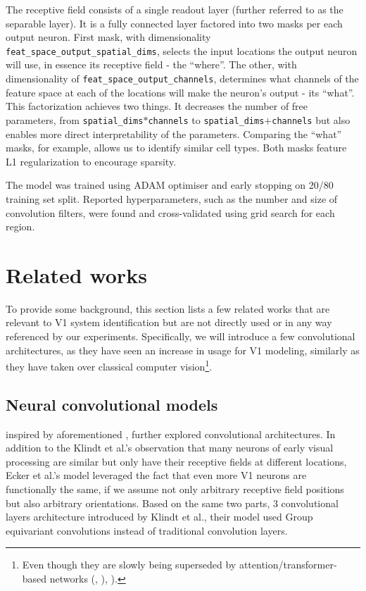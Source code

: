 The receptive field consists of a single readout layer (further referred to as the separable layer). It is a fully connected layer factored into two masks per each output neuron. First mask, with dimensionality \texttt{feat\_space\_output\_spatial\_dims}, selects the input locations the output neuron will use, in essence its receptive field - the “where”. The other, with dimensionality of \texttt{feat\_space\_output\_channels}, determines what channels of the feature space at each of the locations will make the neuron’s output - its “what”. This factorization achieves two things. It decreases the number of free parameters, from \texttt{spatial\_dims}$*$\texttt{channels} to \texttt{spa\-tial\_dims}$+$\texttt{channels} but also enables more direct interpretability of the parameters. Comparing the “what” masks, for example, allows us to identify similar cell types. Both masks feature L1 regularization to encourage sparsity.

The model was trained using ADAM optimiser and early stopping on 20/80 training set split. Reported hyperparameters, such as the number and size of convolution filters, were found and cross-validated using grid search for each region.

\section{Related works}\label{ch:2.3}
To provide some background, this section lists a few related works that are relevant to V1 system identification but are not directly used or in any way referenced by our experiments. Specifically, we will introduce a few convolutional architectures, as they have seen an increase in usage for V1 modeling, similarly as they have taken over classical computer vision\footnote{Even though they are slowly being superseded by attention/transformer-based networks (\citep{2019arXiv190605909R}, \citep{2019arXiv190409925B}), \citep{dosovitskiy2020image}).}.

\subsection{Neural convolutional models}
\cite{ecker} inspired by aforementioned \cite{klindt}, further explored convolutional architectures. In addition to the Klindt et al.’s observation that many neurons of early visual processing are similar but only have their receptive fields at different locations, Ecker et al.’s model leveraged the fact that even more V1 neurons are functionally the same, if we assume not only arbitrary receptive field positions but also arbitrary orientations. Based on the same two parts, 3 convolutional layers architecture introduced by Klindt et al., their model used Group equivariant convolutions \citep{2016arXiv160207576C} instead of traditional convolution layers.

